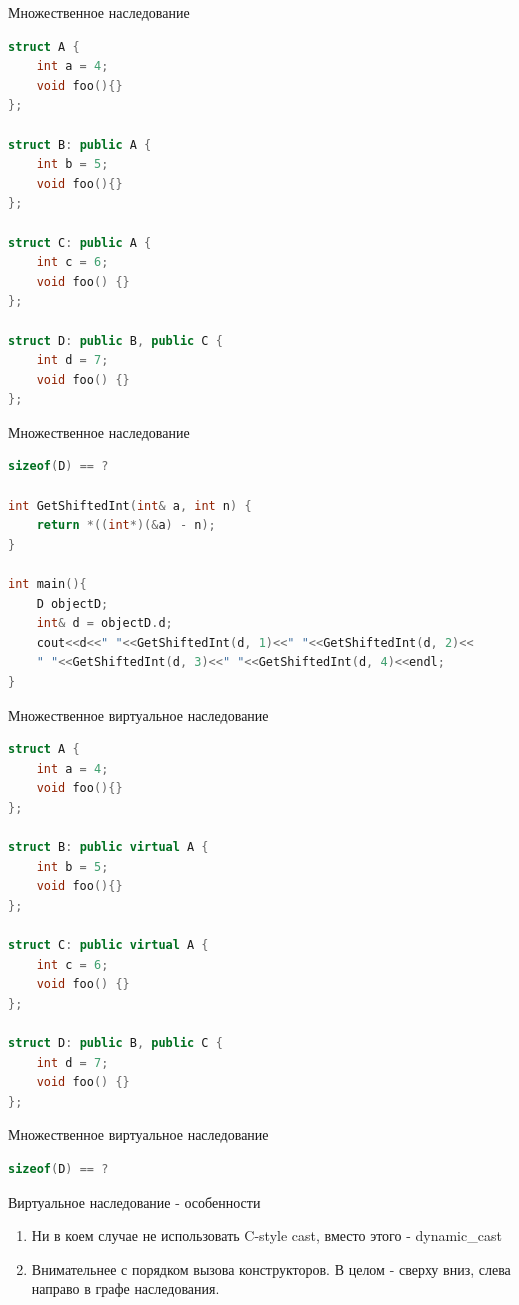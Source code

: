 \documentclass[10pt]{beamer}
\begin{document}
\begin{frame}[fragile]{Множественное наследование}
\begin{lstlisting}[language=C++]
struct A {
    int a = 4;
    void foo(){}
};

struct B: public A {
    int b = 5;
    void foo(){}
};

struct C: public A {
    int c = 6;
    void foo() {}
};

struct D: public B, public C {
    int d = 7;
    void foo() {}
};
\end{lstlisting}
\end{frame}

\begin{frame}[fragile]{Множественное наследование}
\begin{lstlisting}[language=C++]
sizeof(D) == ?

int GetShiftedInt(int& a, int n) {
    return *((int*)(&a) - n);
}

int main(){
    D objectD;
    int& d = objectD.d;
    cout<<d<<" "<<GetShiftedInt(d, 1)<<" "<<GetShiftedInt(d, 2)<<
    " "<<GetShiftedInt(d, 3)<<" "<<GetShiftedInt(d, 4)<<endl;
}


\end{lstlisting}
\end{frame}

\begin{frame}[fragile]{Множественное виртуальное наследование}
\begin{lstlisting}[language=C++]
struct A {
    int a = 4;
    void foo(){}
};

struct B: public virtual A {
    int b = 5;
    void foo(){}
};

struct C: public virtual A {
    int c = 6;
    void foo() {}
};

struct D: public B, public C {
    int d = 7;
    void foo() {}
};
\end{lstlisting}
\end{frame}

\begin{frame}[fragile]{Множественное виртуальное наследование}
\begin{lstlisting}[language=C++]
sizeof(D) == ?

\end{lstlisting}
\end{frame}


\begin{frame}[fragile]{Виртуальное наследование - особенности}
\begin{enumerate}
\item Ни в коем случае не использовать C-style cast, вместо этого - dynamic\_cast
\item Внимательнее с порядком вызова конструкторов. В целом - сверху вниз, слева направо в графе наследования.

\end{enumerate}
\end{frame}
\end{document}
